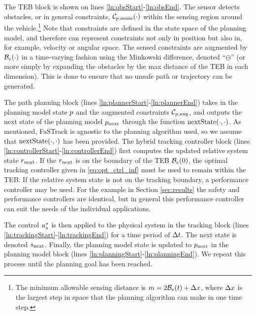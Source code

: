 The TEB block is shown on lines \ref{ln:obsStart}-\ref{ln:obsEnd}. 
The sensor detects obstacles, or in general constraints, $\mathcal C_{p,\text{sense}}(\cdot)$ within the sensing region around the vehicle.\footnote{The minimum allowable sensing distance is $m = 2\mathcal B_e(t) + \Delta x$, where $\Delta x$ is the largest step in space that the planning algorithm can make in one time step.} 
Note that constraints are defined in the state space of the planning model, and therefore can represent constraints not only in position but also in, for example, velocity or angular space.
The sensed constraints are augmented by $\mathcal B_e(\cdot)$ in a time-varying fashion using the Minkowski difference, denoted ``$\ominus$'' (or more simply by expanding the obstacles by the max distance of the TEB in each dimension). 
This is done to ensure that no unsafe path or trajectory can be generated.

The path planning block (lines \ref{ln:plannerStart}-\ref{ln:plannerEnd}) takes in the planning model state $p$ and the augmented constraints $\mathcal C_{p,\text{aug}}$, and outputs the next state of the planning model $p_\text{next}$ through the function $\text{nextState}(\cdot, \cdot)$.
As mentioned, FaSTrack is agnostic to the planning algorithm used, so we assume that $\text{nextState}(\cdot, \cdot)$ has been provided.
The hybrid tracking controller block (lines \ref{ln:controllerStart}-\ref{ln:controllerEnd}) first computes the updated relative system state $r_\text{next}$. 
If the $r_\text{next}$ is on the boundary of the TEB $\mathcal B_e(0)$, the optimal tracking controller given in \eqref{eq:opt_ctrl_inf} must be used to remain within the TEB. 
If the relative system state is not on the tracking boundary, a performance controller may be used. For the example in Section \ref{sec:results} the safety and performance controllers are identical, but in general this performance controller can suit the needs of the individual applications.

The control $u_s^*$ is then applied to the physical system in the tracking block (lines \ref{ln:trackingStart}-\ref{ln:trackingEnd}) for a time period of $\Delta t$. 
The next state is denoted $s_\text{next}$. 
Finally, the planning model state is updated to $p_\text{next}$ in the planning model block (lines \ref{ln:planningStart}-\ref{ln:planningEnd}). 
We repeat this process until the planning goal has been reached.